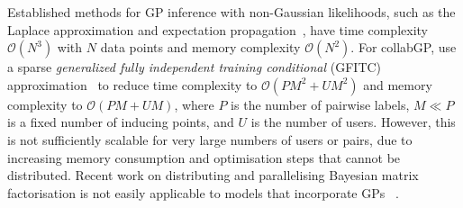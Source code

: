 
Established methods for GP inference with non-Gaussian likelihoods,
such as the Laplace approximation 
and expectation propagation~\citep{rasmussen_gaussian_2006}, have
time complexity $\mathcal{O}(N^3)$ with $N$ data points
 and memory complexity $\mathcal{O}(N^2)$. 
For collabGP, \citet{houlsby2012collaborative}
use a sparse \emph{generalized fully independent training conditional} (GFITC) 
approximation~\citep{snelson2006sparse} to reduce time complexity to $\mathcal{O}(PM^2 + UM^2)$ and 
memory complexity to $\mathcal{O}(PM + UM)$,
where $P$ is the number of pairwise labels, 
$M \ll P$ is a fixed number of inducing points, 
and $U$ is the number of users.
However, this is not sufficiently scalable
for very large numbers of users or pairs, 
due to increasing memory consumption 
and optimisation steps that cannot be distributed. %
Recent work on distributing and parallelising Bayesian matrix factorisation 
is not easily applicable to models that incorporate GPs
 ~\citep{ahn2015large,saha2015scalable,vander2017distributed,chen2018large}. 
 
